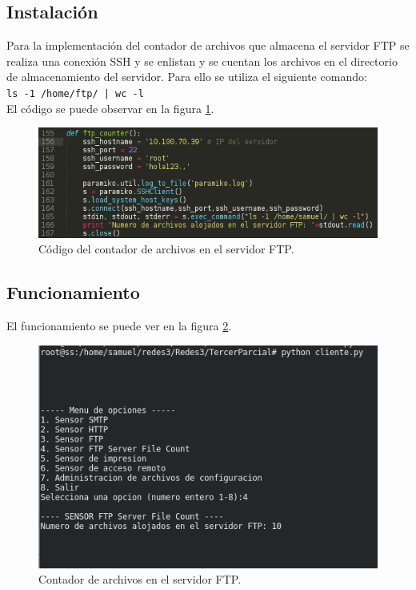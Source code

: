 \subsection{Instalación}
Para la implementación del contador de archivos que almacena el servidor FTP se realiza una conexión SSH y se enlistan y se cuentan los archivos en el directorio de almacenamiento del servidor. Para ello se utiliza el siguiente comando:\\
\texttt{ls -1 /home/ftp/ | wc -l}\\

El código se puede observar en la figura \ref{image:ftpcounter}.

\FloatBarrier
\begin{figure}[htbp!]
		\centering
			\includegraphics[width=.75 \textwidth]{images/ftpcounter}
		\caption{Código del contador de archivos en el servidor FTP.}
		\label{image:ftpcounter}
\end{figure}
\FloatBarrier
\subsection{Funcionamiento}
El funcionamiento se puede ver en la figura \ref{image:ftpcounterfunc}.

\FloatBarrier
\begin{figure}[htbp!]
		\centering
			\includegraphics[width=.75 \textwidth]{images/ftpcounterfunc}
		\caption{Contador de archivos en el servidor FTP.}
		\label{image:ftpcounterfunc}
\end{figure}
\FloatBarrier